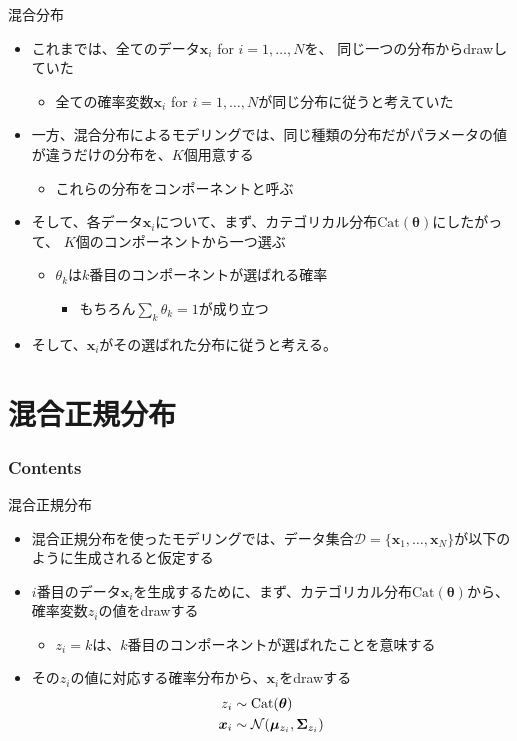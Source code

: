 \documentclass[aspectratio=169,unicode,dvipdfmx,14pt]{beamer}
\begin{document}
\begin{frame}{混合分布}
\begin{itemize}
\item これまでは、全てのデータ$\bm{x}_i$ for $i=1,\ldots,N$を、
同じ一つの分布からdrawしていた
\begin{itemize}
\item 全ての確率変数$\bm{x}_i$ for $i=1,\ldots,N$が同じ分布に従うと考えていた
\end{itemize}
\item 一方、混合分布によるモデリングでは、同じ種類の分布だがパラメータの値が違うだけの分布を、$K$個用意する
\begin{itemize}
\item これらの分布をコンポーネントと呼ぶ
\end{itemize}
\item そして、各データ$\bm{x}_i$について、まず、カテゴリカル分布$\mbox{Cat}(\bm{\theta})$にしたがって、
$K$個のコンポーネントから一つ選ぶ
\begin{itemize}
\item $\theta_k$は$k$番目のコンポーネントが選ばれる確率
\begin{itemize}
\item もちろん$\sum_k \theta_k = 1$が成り立つ
\end{itemize}
\end{itemize}
\item そして、$\bm{x}_i$がその選ばれた分布に従うと考える。
\end{itemize}
\end{frame}


\section{混合正規分布}

\begin{frame}\frametitle{Contents}
\Large \tableofcontents[currentsection]
\end{frame}

\begin{frame}{混合正規分布}
\begin{itemize}
\item 混合正規分布を使ったモデリングでは、データ集合$\mathcal{D}=\{\bm{x}_1, \ldots, \bm{x}_N\}$が以下のように生成されると仮定する
\item $i$番目のデータ$\bm{x}_i$を生成するために、まず、カテゴリカル分布$\mbox{Cat}(\bm{\theta})$から、
確率変数$z_i$の値をdrawする
\begin{itemize}
\item $z_i = k$は、$k$番目のコンポーネントが選ばれたことを意味する
\end{itemize}
\item その$z_i$の値に対応する確率分布から、$\bm{x}_i$をdrawする
\begin{align}
z_i & \sim \mbox{Cat}(\bm{\theta}) \notag \\
\bm{x}_i & \sim \mathcal{N}(\bm{\mu}_{z_i}, \bm{\Sigma}_{z_i})
\end{align}
\end{itemize}
\end{frame}
\end{document}
